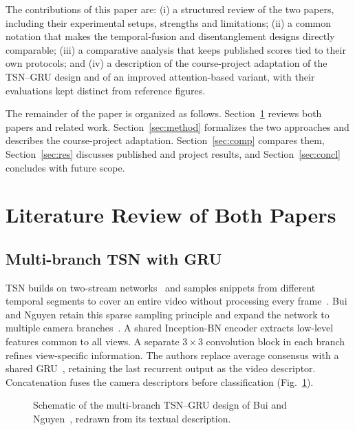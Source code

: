 \documentclass[runningheads]{llncs}
\begin{document}
The contributions of this paper are: (i) a structured review of the two papers, including their experimental setups, strengths and limitations; (ii) a common notation that makes the temporal-fusion and disentanglement designs directly comparable; (iii) a comparative analysis that keeps published scores tied to their own protocols; and (iv) a description of the course-project adaptation of the TSN--GRU design and of an improved attention-based variant, with their evaluations kept distinct from reference figures.

The remainder of the paper is organized as follows. Section~\ref{sec:lit} reviews both papers and related work. Section~\ref{sec:method} formalizes the two approaches and describes the course-project adaptation. Section~\ref{sec:comp} compares them, Section~\ref{sec:res} discusses published and project results, and Section~\ref{sec:concl} concludes with future scope.

\section{Literature Review of Both Papers}\label{sec:lit}
\subsection{Multi-branch TSN with GRU}
TSN builds on two-stream networks~\cite{twostream} and samples snippets from different temporal segments to cover an entire video without processing every frame~\cite{tsn}. Bui and Nguyen retain this sparse sampling principle and expand the network to multiple camera branches~\cite{bui}. A shared Inception-BN encoder extracts low-level features common to all views. A separate $3\times3$ convolution block in each branch refines view-specific information. The authors replace average consensus with a shared GRU~\cite{gru}, retaining the last recurrent output as the video descriptor. Concatenation fuses the camera descriptors before classification (Fig.~\ref{fig:tsngru}).

\begin{figure}[tb]
\centering
{}
\caption{Schematic of the multi-branch TSN--GRU design of Bui and Nguyen~\cite{bui}, redrawn from its textual description.}
\label{fig:tsngru}
\end{figure}
\end{document}
